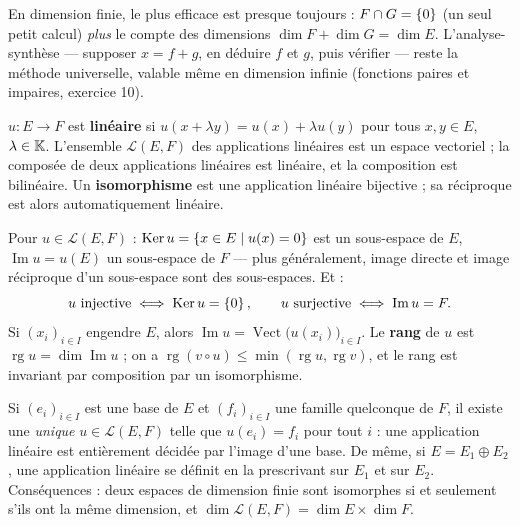\begin{savoirfaire}[Montrer que $E=F\oplus G$]
En dimension finie, le plus efficace est presque toujours :
$F\cap G=\left\{0\right\}$ (un seul petit calcul) \emph{plus} le compte des
dimensions $\dim F+\dim G=\dim E$. L'analyse-synthèse — supposer $x=f+g$,
en déduire $f$ et $g$, puis vérifier — reste la méthode universelle, valable
même en dimension infinie (fonctions paires et impaires, exercice 10).
\end{savoirfaire}


\begin{definition}
$u:E\to F$ est \textbf{linéaire} si $u(x+\lambda y)=u(x)+\lambda u(y)$ pour
tous $x,y\in E$, $\lambda\in\mathbb{K}$. L'ensemble $\mathcal{L}(E,F)$ des
applications linéaires est un espace vectoriel ; la composée de deux
applications linéaires est linéaire, et la composition est bilinéaire. Un
\textbf{isomorphisme} est une application linéaire bijective ; sa réciproque
est alors automatiquement linéaire.
\end{definition}

\begin{theoreme}
Pour $u\in\mathcal{L}(E,F)$ :
$\operatorname{Ker}u=\left\{x\in E\mid u(x)=0\right\}$ est un sous-espace de $E$,
$\operatorname{Im}u=u(E)$ un sous-espace de $F$ — plus généralement, image
directe et image réciproque d'un sous-espace sont des sous-espaces. Et :
\[
u\ \text{injective}\iff\operatorname{Ker}u=\ens{0},
\qquad
u\ \text{surjective}\iff\operatorname{Im}u=F .
\]
Si $(x_i)_{i\in I}$ engendre $E$, alors
$\operatorname{Im}u=\operatorname{Vect}\bigl(u(x_i)\bigr)_{i\in I}$. Le
\textbf{rang} de $u$ est $\operatorname{rg}u=\dim\operatorname{Im}u$ ; on a
$\operatorname{rg}(v\circ u)\leqslant\min(\operatorname{rg}u,\operatorname{rg}v)$,
et le rang est invariant par composition par un isomorphisme.
\end{theoreme}

\begin{theoreme}
Si $(e_i)_{i\in I}$ est une base de $E$ et $(f_i)_{i\in I}$ une famille
quelconque de $F$, il existe une \emph{unique} $u\in\mathcal{L}(E,F)$ telle
que $u(e_i)=f_i$ pour tout $i$ : une application linéaire est entièrement
décidée par l'image d'une base. De même, si $E=E_1\oplus E_2$, une
application linéaire se définit en la prescrivant sur $E_1$ et sur $E_2$.
Conséquences : deux espaces de dimension finie sont isomorphes si et
seulement s'ils ont la même dimension, et
$\dim\mathcal{L}(E,F)=\dim E\times\dim F$.
\end{theoreme}


